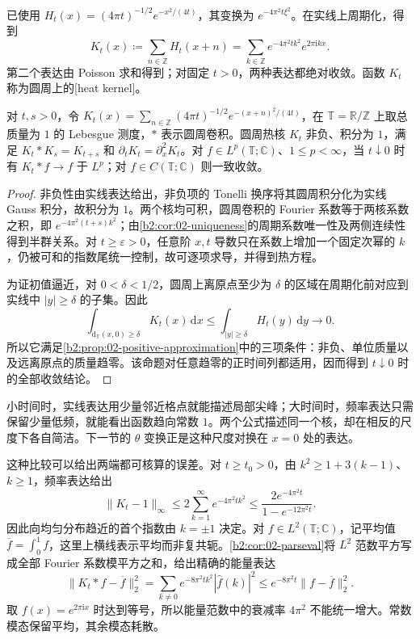 已使用 \(H_t(x)=(4\pi t)^{-1/2}e^{-x^2/(4t)}\)，其变换为 \(e^{-4\pi^2t\xi^2}\)。在实线上周期化，得到
\begin{equation}\label{b2:eq:06-periodic-heat}
 K_t(x)\coloneqq\sum_{n\in\mathbb Z}H_t(x+n)
 =\sum_{k\in\mathbb Z}e^{-4\pi^2tk^2}e^{2\pi\mathrm{i}kx}.
\end{equation}
第二个表达由 Poisson 求和得到；对固定 \(t>0\)，两种表达都绝对收敛。函数 \(K_t\) 称为圆周上的[heat kernel]。

\begin{proposition}\label{b2:prop:06-heat-kernel}
对 \(t,s>0\)，令 \(K_t(x)=\sum_{n\in\mathbb Z}(4\pi t)^{-1/2}e^{-(x+n)^2/(4t)}\)，在 \(\mathbb T=\mathbb R/\mathbb Z\) 上取总质量为 \(1\) 的 Lebesgue 测度，\(*\) 表示圆周卷积。圆周热核 \(K_t\) 非负、积分为 \(1\)，满足 \(K_t*K_s=K_{t+s}\) 和 \(\partial_tK_t=\partial_x^2K_t\)。对 \(f\in L^p(\mathbb T;\mathbb C)\)、\(1\leq p<\infty\)，当 \(t\downarrow0\) 时有 \(K_t*f\to f\) 于 \(L^p\)；对 \(f\in C(\mathbb T;\mathbb C)\) 则一致收敛。
\end{proposition}
\begin{proof}
非负性由实线表达给出，非负项的 Tonelli 换序将其圆周积分化为实线 Gauss 积分，故积分为 \(1\)。两个核均可积，圆周卷积的 Fourier 系数等于两核系数之积，即 \(e^{-4\pi^2(t+s)k^2}\)；由\cref{b2:cor:02-uniqueness}的周期系数唯一性及两侧连续性得到半群关系。对 \(t\geq\varepsilon>0\)，任意阶 \(x,t\) 导数只在系数上增加一个固定次幂的 \(k\)，仍被可和的指数尾统一控制，故可逐项求导，并得到热方程。

为证初值逼近，对 \(0<\delta<1/2\)，圆周上离原点至少为 \(\delta\) 的区域在周期化前对应到实线中 \(|y|\geq\delta\) 的子集。因此
\[
 \int_{\mathrm{d}_{\mathbb T}(x,0)\geq\delta}K_t(x)\,\mathrm{d}x
 \leq\int_{|y|\geq\delta}H_t(y)\,\mathrm{d}y\longrightarrow0.
\]
所以它满足\cref{b2:prop:02-positive-approximation}中的三项条件：非负、单位质量以及远离原点的质量趋零。该命题对任意趋零的正时间列都适用，因而得到 \(t\downarrow0\) 时的全部收敛结论。
\end{proof}

小时间时，实线表达用少量邻近格点就能描述局部尖峰；大时间时，频率表达只需保留少量低频，就能看出函数趋向常数 \(1\)。两个公式描述同一个核，却在相反的尺度下各自简洁。下一节的 \(\theta\) 变换正是这种尺度对换在 \(x=0\) 处的表达。

\ProseParagraphBreak

这种比较可以给出两端都可核算的误差。对 \(t\geq t_0>0\)，由 \(k^2\geq1+3(k-1)\)、\(k\geq1\)，频率表达给出
\[
 \|K_t-1\|_\infty
 \leq2\sum_{k=1}^\infty e^{-4\pi^2tk^2}
 \leq\frac{2e^{-4\pi^2t}}{1-e^{-12\pi^2t}}.
\]
因此向均匀分布趋近的首个指数由 \(k=\pm1\) 决定。对 \(f\in L^2(\mathbb T;\mathbb C)\)，记平均值 \(\overline f=\int_0^1f\)，这里上横线表示平均而非复共轭。\cref{b2:cor:02-parseval}将 \(L^2\) 范数平方写成全部 Fourier 系数模平方之和，给出精确的能量表达
\[
 \|K_t*f-\overline f\|_2^2
 =\sum_{k\ne0}e^{-8\pi^2tk^2}|\widehat f(k)|^2
 \leq e^{-8\pi^2t}\|f-\overline f\|_2^2.
\]
取 \(f(x)=e^{2\pi\mathrm{i}x}\) 时达到等号，所以能量范数中的衰减率 \(4\pi^2\) 不能统一增大。常数模态保留平均，其余模态耗散。

